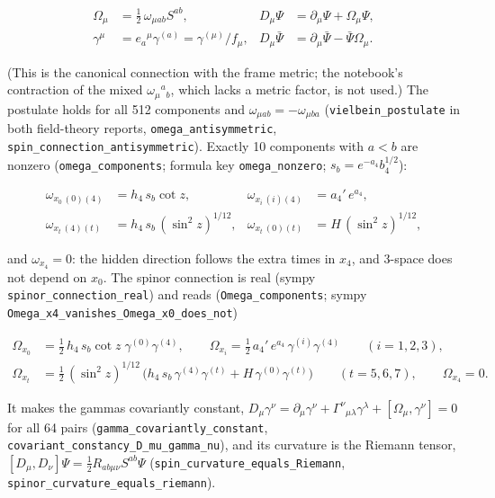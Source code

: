 \documentclass[11pt]{article}
\begin{document}
\[
\begin{aligned}
\Omega_\mu &= \tfrac12\,\omega_{\mu ab}S^{ab}, & D_\mu\Psi &= \partial_\mu\Psi + \Omega_\mu\Psi, \\
\gamma^\mu &= e_a{}^\mu\gamma^{(a)} = \gamma^{(\mu)}/f_\mu, & D_\mu\bar\Psi &= \partial_\mu\bar\Psi - \bar\Psi\Omega_\mu.
\end{aligned}
\]

(This is the canonical connection with the frame metric; the notebook's contraction of the mixed $\omega_\mu{}^a{}_b$, which lacks a metric factor, is not used.) The postulate holds for all 512 components and $\omega_{\mu ab} = -\omega_{\mu ba}$ (\texttt{vielbein\allowbreak{}\_postula\allowbreak{}te} in both field-theory reports, \texttt{omega\_an\allowbreak{}tisymmet\allowbreak{}ric}, \texttt{spin\_con\allowbreak{}nection\_\allowbreak{}antisymm\allowbreak{}etric}). Exactly 10 components with $a < b$ are nonzero (\texttt{omega\_co\allowbreak{}mponents}; formula key \texttt{omega\_no\allowbreak{}nzero}; $s_b = e^{-a_4}b_4^{1/2}$):

\[
\begin{aligned}
\omega_{x_0\,(0)(4)} &= h_4\,s_b\cot z, & \omega_{x_i\,(i)(4)} &= a_4'\,e^{a_4}, \\
\omega_{x_t\,(4)(t)} &= h_4\,s_b\,(\sin^2 z)^{1/12}, & \omega_{x_t\,(0)(t)} &= H\,(\sin^2 z)^{1/12},
\end{aligned}
\]

and $\omega_{x_4} = 0$: the hidden direction follows the extra times in $x_4$, and 3-space does not depend on $x_0$. The spinor connection is real (sympy \texttt{spinor\_c\allowbreak{}onnectio\allowbreak{}n\_real}) and reads (\texttt{Omega\_co\allowbreak{}mponents}; sympy \texttt{Omega\_x4\allowbreak{}\_vanishe\allowbreak{}s\_Omega\_\allowbreak{}x0\_does\_\allowbreak{}not})

\[
\begin{aligned}
\Omega_{x_0} &= \tfrac12\,h_4\,s_b\cot z\;\gamma^{(0)}\gamma^{(4)}, \qquad \Omega_{x_i} = \tfrac12\,a_4'\,e^{a_4}\,\gamma^{(i)}\gamma^{(4)} \qquad (i = 1, 2, 3), \\
\Omega_{x_t} &= \tfrac12\,(\sin^2 z)^{1/12}\,\big(h_4\,s_b\,\gamma^{(4)}\gamma^{(t)} + H\,\gamma^{(0)}\gamma^{(t)}\big) \qquad (t = 5, 6, 7), \qquad \Omega_{x_4} = 0.
\end{aligned}
\]

It makes the gammas covariantly constant, $D_\mu\gamma^\nu = \partial_\mu\gamma^\nu + \Gamma^\nu{}_{\mu\lambda}\gamma^\lambda + [\Omega_\mu, \gamma^\nu] = 0$ for all 64 pairs (\texttt{gamma\_co\allowbreak{}variantl\allowbreak{}y\_consta\allowbreak{}nt}, \texttt{covarian\allowbreak{}t\_consta\allowbreak{}ncy\_D\_mu\allowbreak{}\_gamma\_n\allowbreak{}u}), and its curvature is the Riemann tensor, $[D_\mu, D_\nu]\Psi = \frac12 R_{ab\mu\nu}S^{ab}\Psi$ (\texttt{spin\_cur\allowbreak{}vature\_e\allowbreak{}quals\_Ri\allowbreak{}emann}, \texttt{spinor\_c\allowbreak{}urvature\allowbreak{}\_equals\_\allowbreak{}riemann}).
\end{document}
